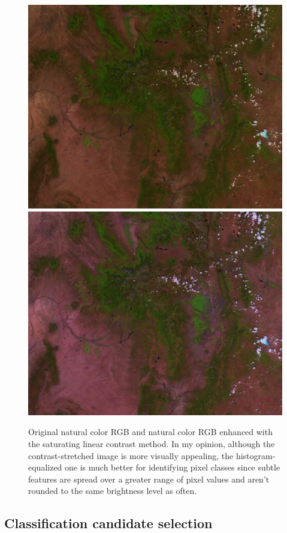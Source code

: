 \documentclass[12pt]{article}
\begin{document}
\begin{figure}[h!]
    \centering
    \includegraphics[width=.48\linewidth]{figures/p2/naturalcolor_original.png}
    \includegraphics[width=.48\linewidth]{figures/p2/truecolor_contrast.png}

    \caption{Original natural color RGB and natural color RGB enhanced with the saturating linear contrast method. In my opinion, although the contrast-stretched image is more visually appealing, the histogram-equalized one is much better for identifying pixel classes since subtle features are spread over a greater range of pixel values and aren't rounded to the same brightness level as often.}
    \label{p2_contrast}
\end{figure}

\clearpage

\subsection{Classification candidate selection}
\end{document}
